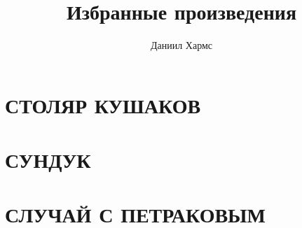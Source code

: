 \documentclass{article}
\title{Избранные произведения}
\author{Даниил Хармс}
\begin{document}
\maketitle

\section{СТОЛЯР КУШАКОВ}



\section{СУНДУК}



\section{}



\section{СЛУЧАЙ С ПЕТРАКОВЫМ}


\end{document}
